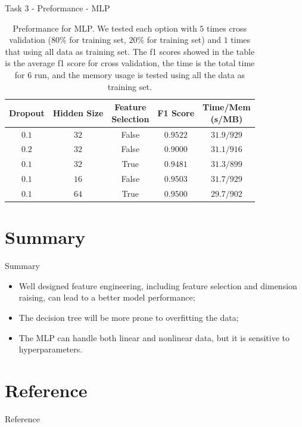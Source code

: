 \documentclass{beamer}
\begin{document}
\begin{frame}{Task 3 - Preformance - MLP}

  \begin{table}[H]
    \centering
    \begin{tabular}{|c|c|c|c|c|}
      \hline
      Dropout & Hidden Size & \makecell{Feature                         \\ Selection} & F1 Score & \makecell{Time/Mem \\ (s/MB)} \\
      \hline
      $0.1$   & $32$        & False             & $0.9522$ & $31.9/929$ \\
      \hline
      $0.2$   & $32$        & False             & $0.9000$ & $31.1/916$ \\
      \hline
      $0.1$   & $32$        & True              & $0.9481$ & $31.3/899$ \\
      \hline
      $0.1$   & $16$        & False             & $0.9503$ & $31.7/929$ \\
      \hline
      $0.1$   & $64$        & True              & $0.9500$ & $29.7/902$ \\
      \hline
    \end{tabular}
    \caption{Preformance for MLP. We tested each option with $5$ times cross validation ($80\%$ for training set, $20\%$ for training set) and $1$ times that using all data as training set. The f1 scores showed in the table is the average f1 score for cross validation, the time is the total time for $6$ run, and the memory usage is tested using all the data as training set.}
  \end{table}

\end{frame}

\section{Summary}

\begin{frame}{Summary}

  \begin{itemize}
    \item Well designed feature engineering, including feature selection and dimension raising, can lead to a better model performance; \vspace{.25cm}
    \item The decision tree will be more prone to overfitting the data; \vspace{.25cm}
    \item The MLP can handle both linear and nonlinear data, but it is sensitive to hyperparameters. \vspace{.25cm}
  \end{itemize}

\end{frame}

\section*{Reference}
\begin{frame}[allowframebreaks]{Reference}
  \printbibliography
\end{frame}

\appendix
\end{document}
